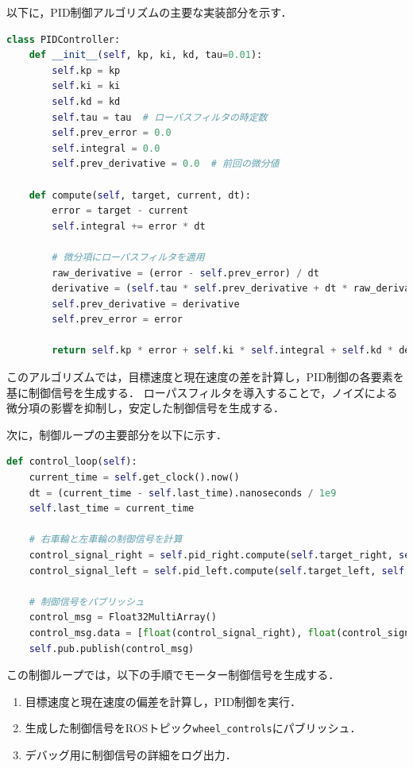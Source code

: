 以下に，PID制御アルゴリズムの主要な実装部分を示す．

\begin{lstlisting}[language=Python, caption=PID制御アルゴリズムの実装 (PID\_node.py)]
class PIDController:
    def __init__(self, kp, ki, kd, tau=0.01):
        self.kp = kp
        self.ki = ki
        self.kd = kd
        self.tau = tau  # ローパスフィルタの時定数
        self.prev_error = 0.0
        self.integral = 0.0
        self.prev_derivative = 0.0  # 前回の微分値

    def compute(self, target, current, dt):
        error = target - current
        self.integral += error * dt

        # 微分項にローパスフィルタを適用
        raw_derivative = (error - self.prev_error) / dt
        derivative = (self.tau * self.prev_derivative + dt * raw_derivative) / (self.tau + dt)
        self.prev_derivative = derivative
        self.prev_error = error

        return self.kp * error + self.ki * self.integral + self.kd * derivative
\end{lstlisting}

このアルゴリズムでは，目標速度と現在速度の差を計算し，PID制御の各要素を基に制御信号を生成する．
ローパスフィルタを導入することで，ノイズによる微分項の影響を抑制し，安定した制御信号を生成する．

次に，制御ループの主要部分を以下に示す．

\begin{lstlisting}[language=Python, caption=制御ループ (PID\_node.py)]
def control_loop(self):
    current_time = self.get_clock().now()
    dt = (current_time - self.last_time).nanoseconds / 1e9
    self.last_time = current_time

    # 右車輪と左車輪の制御信号を計算
    control_signal_right = self.pid_right.compute(self.target_right, self.current_right, dt)
    control_signal_left = self.pid_left.compute(self.target_left, self.current_left, dt)

    # 制御信号をパブリッシュ
    control_msg = Float32MultiArray()
    control_msg.data = [float(control_signal_right), float(control_signal_left)]
    self.pub.publish(control_msg)
\end{lstlisting}

この制御ループでは，以下の手順でモーター制御信号を生成する．
\begin{enumerate}
    \item 目標速度と現在速度の偏差を計算し，PID制御を実行．
    \item 生成した制御信号をROSトピック\texttt{wheel\_controls}にパブリッシュ．
    \item デバッグ用に制御信号の詳細をログ出力．
\end{enumerate}

